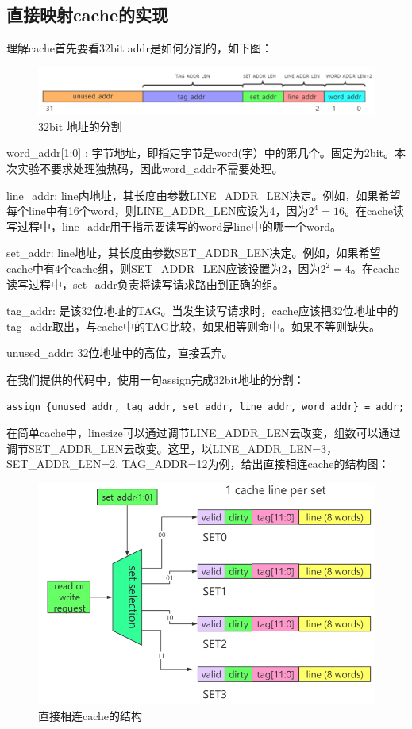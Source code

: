 \documentclass{ctexart}
\begin{document}
\subsection{\hei 直接映射cache的实现}
理解cache首先要看32bit addr是如何分割的，如下图：\par
\begin{figure}[H]
    \centering
    \includegraphics[scale=0.45]{dzfg.png}
    \caption{32bit 地址的分割}
\end{figure}
word\_addr[1:0] :  字节地址，即指定字节是word(字）中的第几个。固定为2bit。本次实验不要求处理独热码，因此word\_addr不需要处理。
\par line\_addr: line内地址，其长度由参数LINE\_ADDR\_LEN决定。例如，如果希望每个line中有16个word，则LINE\_ADDR\_LEN应设为4，因为$2^{4}=16$。在cache读写过程中，line\_addr用于指示要读写的word是line中的哪一个word。
\par set\_addr: line地址，其长度由参数SET\_ADDR\_LEN决定。例如，如果希望cache中有4个cache组，则SET\_ADDR\_LEN应该设置为2，因为$2^{2}=4$。在cache读写过程中，set\_addr负责将读写请求路由到正确的组。
\par tag\_addr: 是该32位地址的TAG。当发生读写请求时，cache应该把32位地址中的tag\_addr取出，与cache中的TAG比较，如果相等则命中。如果不等则缺失。
\par unused\_addr: 32位地址中的高位，直接丢弃。
\par 在我们提供的代码中，使用一句assign完成32bit地址的分割：
\begin{lstlisting}
assign {unused_addr, tag_addr, set_addr, line_addr, word_addr} = addr;
\end{lstlisting}\par
在简单cache中，line\space size可以通过调节LINE\_ADDR\_LEN去改变，组数可以通过调节SET\_ADDR\_LEN去改变。这里，以LINE\_ADDR\_LEN=3，SET\_ADDR\_LEN=2, TAG\_ADDR=12为例，给出直接相连cache的结构图：
\begin{figure}[H]
    \centering
    \includegraphics[scale=0.55]{zjxl.png}
    \caption{直接相连cache的结构}
\end{figure}
\end{document}
